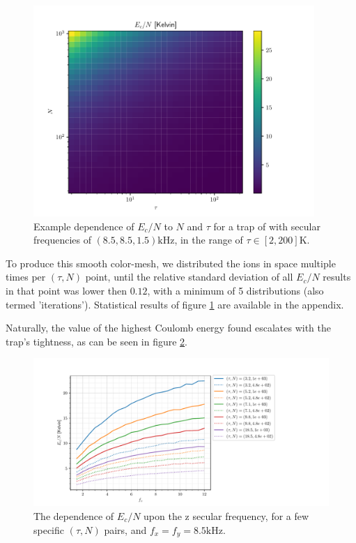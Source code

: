 \begin{figure}
	\begin{center}
		\includegraphics[width=0.95\textwidth]{graphics/coulomb_energy_example@coulomb_energy.pdf}
	\end{center}
	\caption{Example dependence of $E_c/N$ to $N$ and $\tau$ for a trap of  with secular frequencies of $(8.5, 8.5, 1.5) \mathrm{kHz}$, in the range of $\tau\in[2, 200]\mathrm{K}$.}\label{fig:coulomb_energy}
\end{figure}

To produce this smooth color-mesh, we distributed the ions in space multiple times per $(\tau,N)$ point, until the relative standard deviation of all $E_c/N$ results in that point was lower then $0.12$, with a minimum of 5 distributions (also termed 'iterations'). Statistical results of figure \ref{fig:coulomb_energy} are available in the appendix.

Naturally, the value of the highest Coulomb energy found escalates with the trap's tightness, as can be seen in figure \ref{fig:coulomb_energy_f_z}.

\begin{figure}
	\begin{center}
		\includegraphics[width=1.2\textwidth]{graphics/coulomb_energy_f_z.pdf}
	\end{center}
	\caption{The dependence of $E_c/N$ upon the z secular frequency, for a few specific $(\tau,N)$ pairs, and $f_x = f_y = 8.5\mathrm{kHz}$.}\label{fig:coulomb_energy_f_z}
\end{figure}

